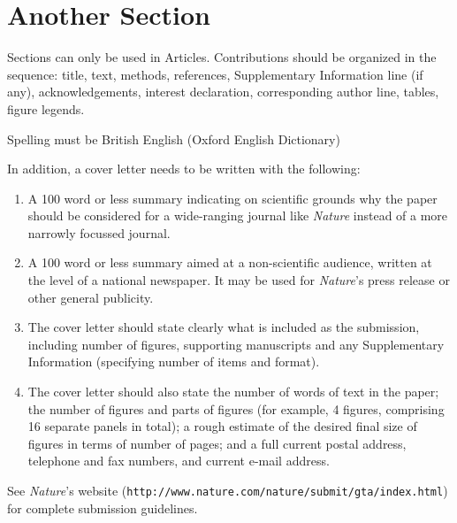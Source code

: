 \documentclass{nature}
\begin{document}
\section*{Another Section}

Sections can only be used in Articles.  Contributions should be
organized in the sequence: title, text, methods, references,
Supplementary Information line (if any), acknowledgements,
interest declaration, corresponding author line, tables, figure
legends.

Spelling must be British English (Oxford English Dictionary)

In addition, a cover letter needs to be written with the
following:
\begin{enumerate}
 \item A 100 word or less summary indicating on scientific grounds
why the paper should be considered for a wide-ranging journal like
\textsl{Nature} instead of a more narrowly focussed journal.
 \item A 100 word or less summary aimed at a non-scientific audience,
written at the level of a national newspaper.  It may be used for
\textsl{Nature}'s press release or other general publicity.
 \item The cover letter should state clearly what is included as the
submission, including number of figures, supporting manuscripts
and any Supplementary Information (specifying number of items and
format).
 \item The cover letter should also state the number of
words of text in the paper; the number of figures and parts of
figures (for example, 4 figures, comprising 16 separate panels in
total); a rough estimate of the desired final size of figures in
terms of number of pages; and a full current postal address,
telephone and fax numbers, and current e-mail address.
\end{enumerate}

See \textsl{Nature}'s website
(\texttt{http://www.nature.com/nature/submit/gta/index.html}) for
complete submission guidelines.
\end{document}
